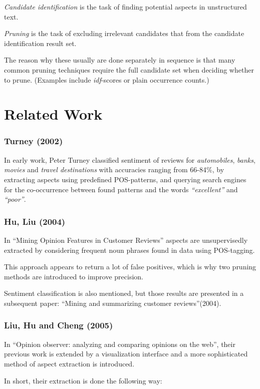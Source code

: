 \documentclass[a4paper,11pt]{kth-mag}
\begin{document}
\emph{Candidate identification} is the task of finding potential aspects in unstructured text.

\emph{Pruning} is the task of excluding irrelevant candidates that from the candidate
identification result set.

The reason why these usually are done separately in sequence is that many common pruning
techniques require the full candidate set when deciding whether to prune.
(Examples include \emph{idf}-scores or plain occurrence counts.)


\section{Related Work}

\subsubsection{Turney (2002)}
In early work, Peter Turney classified sentiment of reviews for \emph{automobiles}, \emph{banks}, \emph{movies} and \emph{travel destinations} with accuracies ranging from 66-84\%, by extracting aspects using predefined POS-patterns, and querying search engines for the co-occurrence between found patterns and the words \emph{``excellent''} and \emph{``poor''}.

\subsubsection{Hu, Liu (2004)}
In ``Mining Opinion Features in Customer Reviews'' aspects are unsupervisedly
extracted by considering frequent noun phrases found in data using POS-tagging.

This approach appears to return a lot of false positives, which is why two pruning
methods are introduced to improve precision.

Sentiment classification is also mentioned, but those results are presented in a subsequent paper:
``Mining and summarizing customer reviews''(2004).


\subsubsection{Liu, Hu and Cheng (2005)}
In ``Opinion observer: analyzing and comparing opinions on the web'', their previous work is extended
by a visualization interface and a more sophisticated method of aspect extraction is introduced.

In short, their extraction is done the following way:
\end{document}
